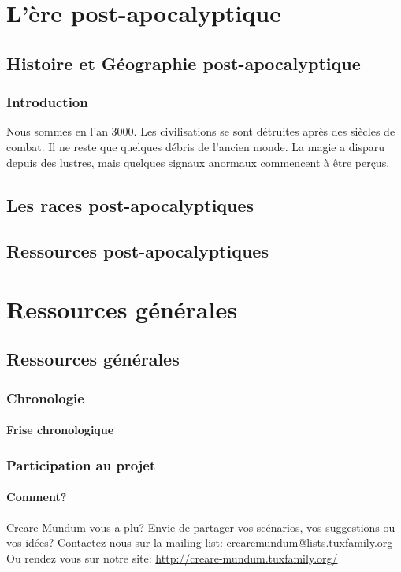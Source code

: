 \documentclass{book}
\begin{document}
\part{L'ère post-apocalyptique}
\chapter{Histoire et Géographie post-apocalyptique}
\section{Introduction}
Nous sommes en l'an 3000. Les civilisations se sont détruites après des siècles de combat. 
Il ne reste que quelques débris de l'ancien monde. 
La magie a disparu depuis des lustres, mais quelques signaux anormaux commencent à être perçus.


\chapter{Les races post-apocalyptiques}



\chapter{Ressources post-apocalyptiques}


\part{Ressources générales}
\chapter*{Ressources générales}
\section{Chronologie}
\subsection{Frise chronologique}

\newpage
\section{Participation au projet}
\subsection{Comment?}
\hypertarget{participation}{}
Creare Mundum vous a plu? 
Envie de partager vos scénarios, vos suggestions ou vos idées?
\newline
Contactez-nous sur la mailing list: \href {mailto:crearemundum@lists.tuxfamily.org}{crearemundum@lists.tuxfamily.org}
\newline
Ou rendez vous sur notre site: \href {http://creare-mundum.tuxfamily.org/} {http://creare-mundum.tuxfamily.org/}
\end{document}
